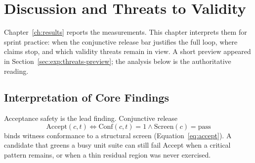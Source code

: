 
\chapter{Discussion and Threats to Validity}
\label{ch:discussion}

Chapter~\ref{ch:results} reports the measurements.
This chapter interprets them for sprint practice: when the conjunctive release
bar justifies the full loop, where claims stop, and which validity threats
remain in view.
A short preview appeared in Section~\ref{sec:exp:threats-preview}; the
analysis below is the authoritative reading.


\section{Interpretation of Core Findings}
\label{sec:disc:interpretation}

Acceptance safety is the lead finding.
Conjunctive release
\[
  \mathrm{Accept}(c,t) \iff \mathrm{Conf}(c,t)=1 \land \mathrm{Screen}(c)=\mathrm{pass}
\]
binds witness conformance to a structural screen
(Equation~\eqref{eq:accept}).
A candidate that greens a busy unit suite can still fail Accept when a
critical pattern remains, or when a thin residual region was never exercised.

